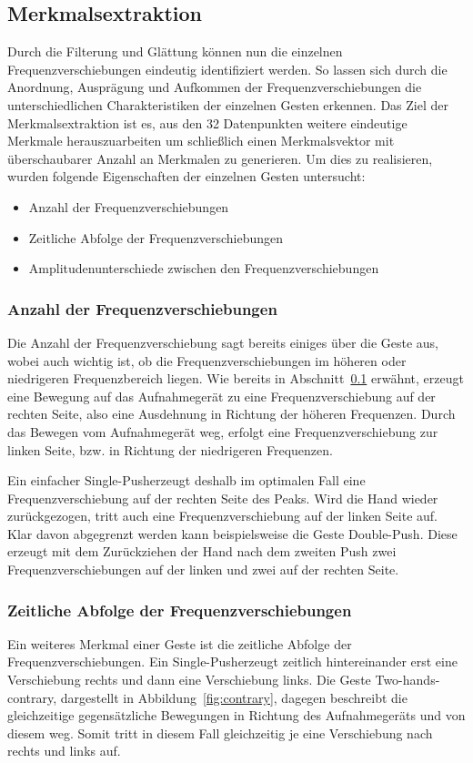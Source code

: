 \subsection{Merkmalsextraktion}
Durch die Filterung und Glättung können nun die einzelnen Frequenzverschiebungen eindeutig identifiziert werden. So lassen sich durch die Anordnung, Ausprägung und Aufkommen der Frequenzverschiebungen die unterschiedlichen Charakteristiken der einzelnen Gesten erkennen. Das Ziel der Merkmalsextraktion ist es, aus den 32 Datenpunkten weitere eindeutige Merkmale herauszuarbeiten um schließlich einen Merkmalsvektor mit überschaubarer Anzahl an Merkmalen zu generieren. Um dies zu realisieren, wurden folgende Eigenschaften der einzelnen Gesten untersucht:

\begin{itemize} 
\item Anzahl der Frequenzverschiebungen
\item Zeitliche Abfolge der Frequenzverschiebungen
\item Amplitudenunterschiede zwischen den Frequenzverschiebungen
\end{itemize}



\subsubsection*{Anzahl der Frequenzverschiebungen}
Die Anzahl der Frequenzverschiebung sagt bereits einiges über die Geste aus, wobei auch wichtig ist, ob die Frequenzverschiebungen im höheren oder niedrigeren Frequenzbereich liegen. Wie bereits in Abschnitt~\ref{} erwähnt, erzeugt eine Bewegung auf das Aufnahmegerät zu eine Frequenzverschiebung auf der rechten Seite, also eine Ausdehnung in Richtung der höheren Frequenzen. Durch das Bewegen vom Aufnahmegerät weg, erfolgt eine Frequenzverschiebung zur linken Seite, bzw. in Richtung der niedrigeren Frequenzen. 

Ein einfacher \glqq Single-Push\grqq erzeugt deshalb im optimalen Fall eine Frequenzverschiebung auf der rechten Seite des Peaks. Wird die Hand wieder zurückgezogen, tritt auch eine Frequenzverschiebung auf der linken Seite auf. Klar davon abgegrenzt werden kann beispielsweise die Geste \glqq Double-Push\grqq. Diese erzeugt mit dem Zurückziehen der Hand nach dem zweiten Push zwei Frequenzverschiebungen auf der linken und zwei auf der rechten Seite.

\subsubsection*{Zeitliche Abfolge der Frequenzverschiebungen}
Ein weiteres Merkmal einer Geste ist die zeitliche Abfolge der Frequenzverschiebungen. Ein \glqq Single-Push\glqq erzeugt zeitlich hintereinander erst eine Verschiebung rechts und dann eine Verschiebung links. Die Geste \glqq Two-hands-contrary\glqq , dargestellt in Abbildung~\ref{fig:contrary}, dagegen beschreibt die gleichzeitige gegensätzliche Bewegungen in Richtung des Aufnahmegeräts und von diesem weg. Somit tritt in diesem Fall gleichzeitig je eine Verschiebung nach rechts und links auf. 


